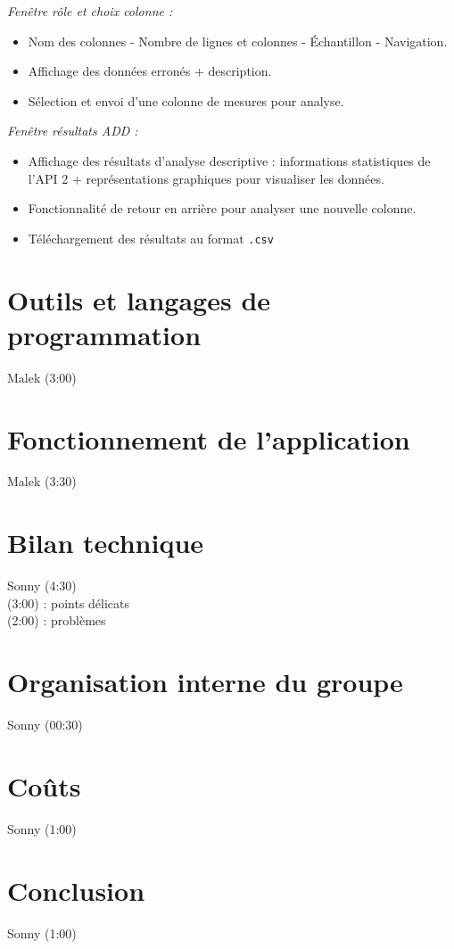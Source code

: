 	\begin{frame}
		\textit{Fenêtre rôle et choix colonne :}
		\begin{itemize}
		\item Nom des colonnes - Nombre de lignes et colonnes - Échantillon - Navigation.
		\item Affichage des données erronés + description.
		\item Sélection et envoi d'une colonne de mesures pour analyse. 
		\end{itemize} \pause
		 \vspace{1cm}
		 
		\textit{Fenêtre résultats ADD :}
		\begin{itemize}
		\item Affichage des résultats d'analyse descriptive : informations statistiques de l'API 2 + représentations graphiques pour visualiser les données.
		\item Fonctionnalité de retour en arrière pour analyser une nouvelle colonne.
		\item Téléchargement des résultats au format \lstinline!.csv!
		\end{itemize}
	\end{frame}
	
	\section{Outils et langages de programmation}
		\begin{frame}
			Malek (3:00)
		\end{frame}
	
	\section{Fonctionnement de l'application}
		\begin{frame}
			Malek (3:30)
		\end{frame}
	
	
	\section{Bilan technique}
		\begin{frame}
			Sonny (4:30)\\
			(3:00) : points délicats\\
			(2:00) : problèmes\\
		\end{frame}
	
	\section{Organisation interne du groupe}
		\begin{frame}
			Sonny (00:30)
		\end{frame}
	
	\section{Coûts}
		\begin{frame}
			Sonny (1:00)
		\end{frame}
	
	\section{Conclusion}
		\begin{frame}
			Sonny (1:00)
		\end{frame}
	

